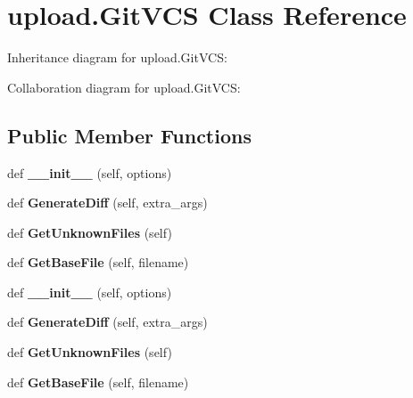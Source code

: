 \hypertarget{classupload_1_1GitVCS}{}\section{upload.\+Git\+V\+CS Class Reference}
\label{classupload_1_1GitVCS}


Inheritance diagram for upload.\+Git\+V\+CS\+:


Collaboration diagram for upload.\+Git\+V\+CS\+:
\subsection*{Public Member Functions}
\begin{DoxyCompactItemize}
\item 
\mbox{\label{classupload_1_1GitVCS_aba4e1dca1c4b3e5db7ba07f6bce3c839}} 
def {\bfseries \+\_\+\+\_\+init\+\_\+\+\_\+} (self, options)
\item 
\mbox{\label{classupload_1_1GitVCS_a3ebfc01cebc9b585706ad3f4389a8833}} 
def {\bfseries Generate\+Diff} (self, extra\+\_\+args)
\item 
\mbox{\label{classupload_1_1GitVCS_ae4e8c0e9fa01619c6a5c76d1ab84b995}} 
def {\bfseries Get\+Unknown\+Files} (self)
\item 
\mbox{\label{classupload_1_1GitVCS_a70ddb65a6b512b8cb8cc4affa37ff9b4}} 
def {\bfseries Get\+Base\+File} (self, filename)
\item 
\mbox{\label{classupload_1_1GitVCS_aba4e1dca1c4b3e5db7ba07f6bce3c839}} 
def {\bfseries \+\_\+\+\_\+init\+\_\+\+\_\+} (self, options)
\item 
\mbox{\label{classupload_1_1GitVCS_a3ebfc01cebc9b585706ad3f4389a8833}} 
def {\bfseries Generate\+Diff} (self, extra\+\_\+args)
\item 
\mbox{\label{classupload_1_1GitVCS_ae4e8c0e9fa01619c6a5c76d1ab84b995}} 
def {\bfseries Get\+Unknown\+Files} (self)
\item 
\mbox{\label{classupload_1_1GitVCS_a70ddb65a6b512b8cb8cc4affa37ff9b4}} 
def {\bfseries Get\+Base\+File} (self, filename)
\end{DoxyCompactItemize}
